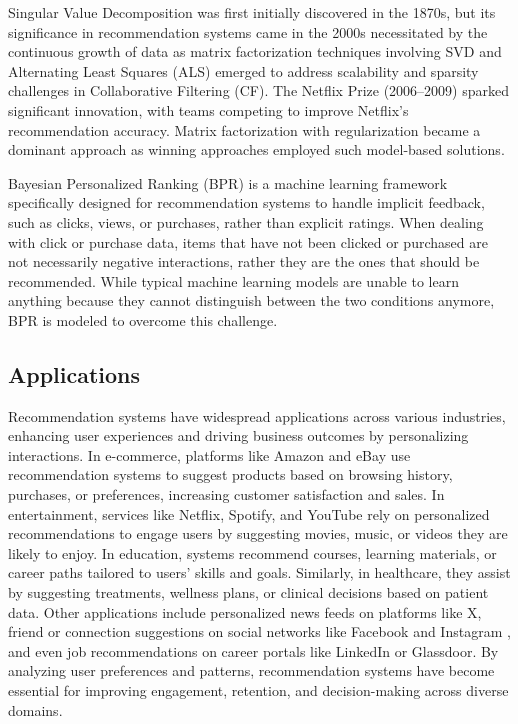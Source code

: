 \documentclass{article}
\begin{document}
Singular Value Decomposition was first initially discovered in the 1870s, but its significance in recommendation systems came in the 2000s necessitated by the continuous growth of data as matrix factorization techniques involving SVD and Alternating Least Squares (ALS) emerged to address scalability and sparsity challenges in Collaborative Filtering (CF). The Netflix Prize (2006–2009) \cite{Bennett2007TheNP} sparked significant innovation, with teams competing to improve Netflix's recommendation accuracy. Matrix factorization with regularization became a dominant approach as winning approaches employed such model-based solutions.

Bayesian Personalized Ranking (BPR) is a machine learning framework specifically designed for recommendation systems to handle implicit feedback, such as clicks, views, or purchases, rather than explicit ratings. When dealing with click or purchase data, items that have not been clicked or purchased are not necessarily negative interactions, rather they are the ones that should be recommended. While typical machine learning models are unable to learn anything because they cannot distinguish between the two conditions anymore, BPR is modeled to overcome this challenge.

\subsection{Applications}
Recommendation systems have widespread applications across various industries, enhancing user experiences and driving business outcomes by personalizing interactions. In e-commerce, platforms like Amazon \cite{amazon} and eBay \cite{ebay} use recommendation systems to suggest products based on browsing history, purchases, or preferences, increasing customer satisfaction and sales. In entertainment, services like Netflix, Spotify, and YouTube \cite{youtube} rely on personalized recommendations to engage users by suggesting movies, music, or videos they are likely to enjoy. In education, systems recommend courses, learning materials, or career paths tailored to users’ skills and goals. Similarly, in healthcare, they assist by suggesting treatments, wellness plans, or clinical decisions based on patient data. Other applications include personalized news feeds on platforms like X, friend or connection suggestions on social networks like Facebook and Instagram \cite{instagram}, and even job recommendations on career portals like LinkedIn or Glassdoor. By analyzing user preferences and patterns, recommendation systems have become essential for improving engagement, retention, and decision-making across diverse domains.
\end{document}
